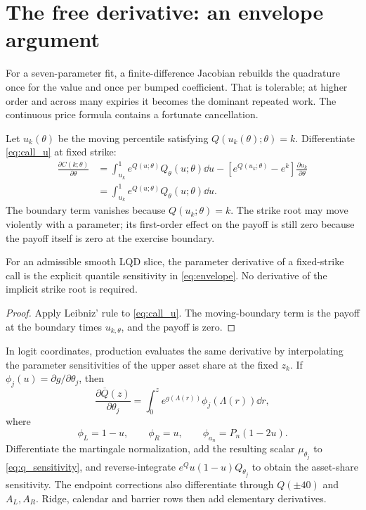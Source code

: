 \documentclass[11pt]{article}
\begin{document}
\section{The free derivative: an envelope argument}
\label{sec:jacobian}

For a seven-parameter fit, a finite-difference Jacobian rebuilds the quadrature
once for the value and once per bumped coefficient.  That is tolerable; at
higher order and across many expiries it becomes the dominant repeated work.
The continuous price formula contains a fortunate cancellation.

Let $u_k(\theta)$ be the moving percentile satisfying
$Q(u_k(\theta);\theta)=k$.  Differentiate \eqref{eq:call_u} at fixed strike:
\begin{align}
\frac{\partial C(k;\theta)}{\partial\theta}
&=\int_{u_k}^{1}
e^{Q(u;\theta)}Q_\theta(u;\theta)\dd u
-\left[e^{Q(u_k;\theta)}-e^k\right]
\frac{\partial u_k}{\partial\theta} \nonumber\\
&=\int_{u_k}^{1}
e^{Q(u;\theta)}Q_\theta(u;\theta)\dd u.
\label{eq:envelope}
\end{align}
The boundary term vanishes because $Q(u_k;\theta)=k$.  The strike root may move
violently with a parameter; its first-order effect on the payoff is still zero
because the payoff itself is zero at the exercise boundary.

\begin{theorem}
\label{thm:envelope}
For an admissible smooth LQD slice, the parameter derivative of a fixed-strike
call is the explicit quantile sensitivity in \eqref{eq:envelope}.  No derivative
of the implicit strike root is required.
\end{theorem}

\begin{proof}
Apply Leibniz' rule to \eqref{eq:call_u}.  The moving-boundary term is the payoff
at the boundary times $u_{k,\theta}$, and the payoff is zero.
\end{proof}

In logit coordinates, production evaluates the same derivative by interpolating
the parameter sensitivities of the upper asset share at the fixed $z_k$.  If
$\phi_j(u)=\partial g/\partial\theta_j$, then
\begin{equation}
\frac{\partial\overline Q(z)}{\partial\theta_j}
=\int_0^z e^{g(\Lambda(r))}\phi_j(\Lambda(r))\dd r,
\label{eq:q_sensitivity}
\end{equation}
where
\[
\phi_L=1-u,\qquad \phi_R=u,\qquad
\phi_{a_n}=P_n(1-2u).
\]
Differentiate the martingale normalization, add the resulting scalar
$\mu_{\theta_j}$ to \eqref{eq:q_sensitivity}, and reverse-integrate
$e^Qu(1-u)Q_{\theta_j}$ to obtain the asset-share sensitivity.  The endpoint
corrections also differentiate through $Q(\pm40)$ and $A_L,A_R$.  Ridge,
calendar and barrier rows then add elementary derivatives.
\end{document}
